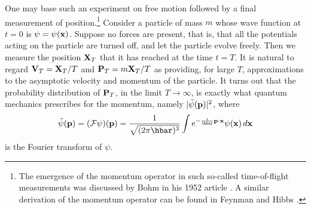 \documentclass[12pt]{article}
\newcommand{\wf}{wave function}
\begin{document}
One may base such an experiment on free motion followed by a final
measurement of position.\footnote{The emergence of the momentum
   operator in such so-called time-of-flight measurements was discussed
   by Bohm in his 1952 article \cite{Boh52}.  A similar derivation of
   the momentum operator can be found in Feynman and Hibbs
   \cite{FH65}.}  Consider a particle of mass $m$ whose \wf{} at $t=0$
is $\psi=\psi({\bf x})$. Suppose no forces are present, that is, that
all the potentials acting on the particle are turned off, and let the
particle evolve freely.  Then we measure the position ${\bf X}_T$ that
it has reached at the time $t=T$.  It is natural to regard ${\bf V}_T
={\bf X}_T/T $ and ${\bf P}_T =m {\bf X}_T/T $ as providing, for large
$T$, approximations to the asymptotic velocity and momentum of the
particle. It turns out that the probability distribution of ${\bf P}_T
$, in the limit $T\to\infty$, is exactly what quantum mechanics
prescribes for the momentum, namely $|\tilde{\psi}({\bf p})|^2$, where
$$
\tilde{\psi}({\bf p}) = (\mathcal{F}\psi)({\bf
   p})=\frac{1}{\sqrt{(2\pi \hbar)^3}} \int e^{ -\frac{i}{\hbar} {\bf p
     \cdot x}} \psi( {\bf x})\, d{\bf x}
$$
is the Fourier transform of $\psi$.
\end{document}
